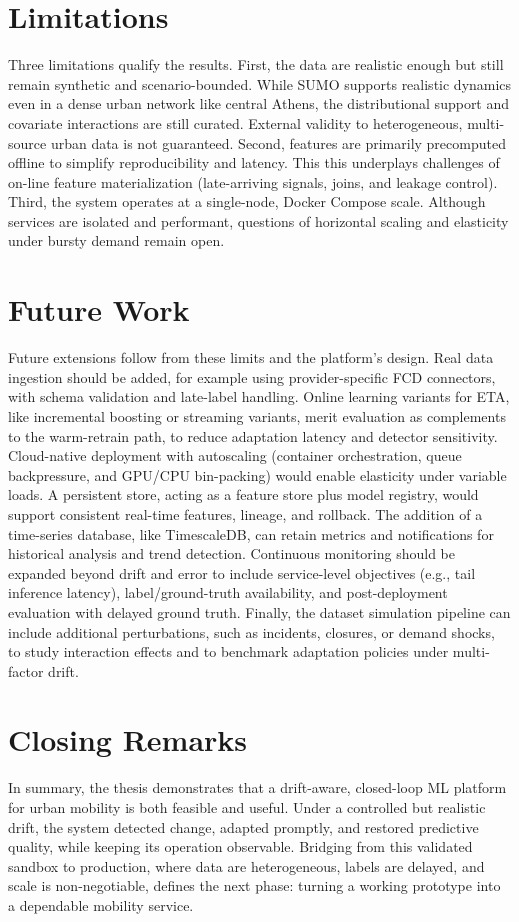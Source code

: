 \section{Limitations}
Three limitations qualify the results.
First, the data are realistic enough but still remain synthetic and scenario-bounded.
While SUMO supports realistic dynamics even in a dense urban network like central Athens, the distributional support and covariate interactions are still curated.
External validity to heterogeneous, multi-source urban data is not guaranteed.
Second, features are primarily precomputed offline to simplify reproducibility and latency.
This this underplays challenges of on-line feature materialization (late-arriving signals, joins, and leakage control).
Third, the system operates at a single-node, Docker Compose scale.
Although services are isolated and performant, questions of horizontal scaling and elasticity under bursty demand remain open.

\section{Future Work}
Future extensions follow from these limits and the platform's design.
Real data ingestion should be added, for example using provider-specific FCD connectors, with schema validation and late-label handling.
Online learning variants for ETA, like incremental boosting or streaming variants, merit evaluation as complements to the warm-retrain path, to reduce adaptation latency and detector sensitivity.
Cloud-native deployment with autoscaling (container orchestration, queue backpressure, and GPU/CPU bin-packing) would enable elasticity under variable loads.
A persistent store, acting as a feature store plus model registry, would support consistent real-time features, lineage, and rollback.
The addition of a time-series database, like TimescaleDB, can retain metrics and notifications for historical analysis and trend detection.
Continuous monitoring should be expanded beyond drift and error to include service-level objectives (e.g., tail inference latency), label/ground-truth availability, and post-deployment evaluation with delayed ground truth.
Finally, the dataset simulation pipeline can include additional perturbations, such as incidents, closures, or demand shocks, to study interaction effects and to benchmark adaptation policies under multi-factor drift.

\section{Closing Remarks}
In summary, the thesis demonstrates that a drift-aware, closed-loop ML platform for urban mobility is both feasible and useful. Under a controlled but realistic drift, the system detected change, adapted promptly, and restored predictive quality, while keeping its operation observable. Bridging from this validated sandbox to production, where data are heterogeneous, labels are delayed, and scale is non-negotiable, defines the next phase: turning a working prototype into a dependable mobility service.
